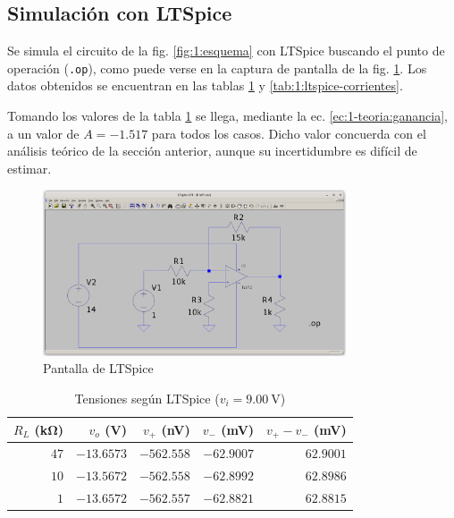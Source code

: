 \subsection{Simulación con LTSpice}

Se simula el circuito de la fig. \ref{fig:1:esquema} con LTSpice buscando el 
punto de operación (\verb|.op|), como puede verse en la captura de pantalla
de la fig. \ref{fig:1:ltspice}. Los datos obtenidos se encuentran en las tablas
\ref{tab:1:ltspice-tensiones} y \ref{tab:1:ltspice-corrientes}.

Tomando los valores de la tabla \ref{tab:1:ltspice-tensiones} se llega,
mediante la ec. \ref{ec:1-teoria:ganancia}, a un valor de $A = -1.517$ para
todos los casos. Dicho valor concuerda con el análisis teórico de la sección
anterior, aunque su incertidumbre es difícil de estimar.

\begin{figure}[H]
    \centering
    \includegraphics[width=0.8\textwidth]{img/1/ltspice.png}
    \caption{Pantalla de LTSpice}
    \label{fig:1:ltspice}
\end{figure}

\begin{table}[H]
    \centering
    \begin{tabular}{@{}r|rrrr@{}}
    \toprule
    $R_L$ (\si{\kilo\ohm}) & $v_o$ (\si{\volt}) & $v_+$ (\si{\nano\volt}) & 
    $v_-$ (\si{\milli\volt}) & $v_+ - v_-$ (\si{\milli\volt}) \\
    \midrule
    $47$ & $-13.6573$ & $-562.558$ & $-62.9007$ & $62.9001$ \\
    $10$ & $-13.5672$ & $-562.558$ & $-62.8992$ & $62.8986$ \\
     $1$ & $-13.6572$ & $-562.557$ & $-62.8821$ & $62.8815$ \\ \bottomrule
    \end{tabular}
    \caption{Tensiones según LTSpice ($v_i = \SI{9.00}{\volt}$)}
    \label{tab:1:ltspice-tensiones}
\end{table}

